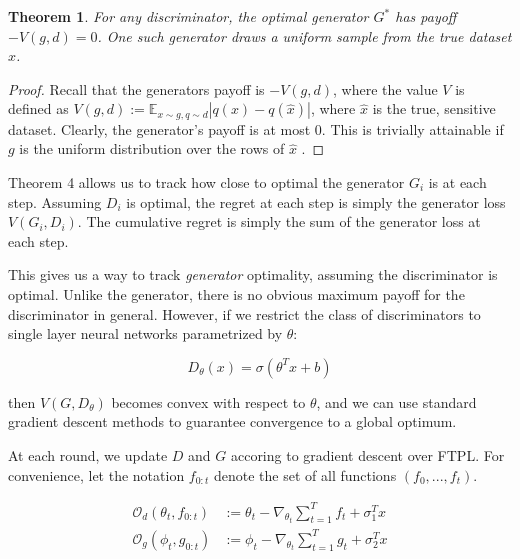 \documentclass[]{article}
\newtheorem{theorem}{Theorem}[section]
\theoremstyle{definition}
\begin{document}
\begin{theorem}
    For any discriminator, the optimal generator $G^*$ has payoff $-V(g,d) = 0$. One such generator draws a uniform sample from the true dataset $\hat x$. 
\end{theorem}
\begin{proof}
    Recall that the generators payoff is  $-V(g,d)$, where the value $V$ is defined as $V(g,d) := \mathbb{E}_{x \sim g, q \sim d} |q(x) - q(\hat x)|$, where $\hat x$ is the true, sensitive dataset. Clearly, the generator's payoff is at most $0$. This is trivially attainable if $g$ is the uniform distribution over the rows of $\hat x$ .
\end{proof}



Theorem 4 allows us to track how close to optimal the generator $G_i$ is at each step. Assuming $D_i$ is optimal, the regret at each step is simply the generator loss $V(G_i, D_i)$. The cumulative regret is simply the sum of the generator loss at each step. 

This gives us a way to track \emph{generator} optimality, assuming the discriminator is optimal. Unlike the generator, there is no obvious maximum payoff for the discriminator in general. 
However, if we restrict the class of discriminators to single layer neural networks parametrized by $\theta$:

\begin{equation}
    D_\theta(x) = \sigma(\theta^Tx + b) 
\end{equation}

then $V(G, D_\theta)$ becomes convex with respect to $\theta$, and we can use standard gradient descent methods to guarantee convergence to a global optimum. 

At each round, we update $D$ and $G$ accoring to gradient descent over FTPL. For convenience, let the notation $f_{0:t}$ denote the set of all functions $(f_0,...,f_t)$.

\begin{align}
     \mathcal{O}_d(\theta_t, f_{0:t}) &:= \theta_t - \nabla_{\theta_t} \sum_{t=1}^T f_t + \sigma_1^Tx \\
 \mathcal{O}_g(\phi_t, g_{0:t}) &:= \phi_t - \nabla_{\theta_t} \sum_{t=1}^T g_t + \sigma_2^Tx 
\end{align}
\end{document}

